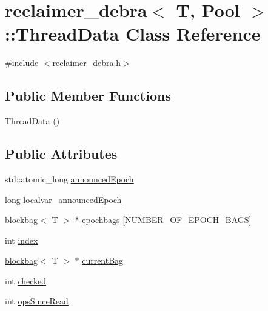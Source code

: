 \hypertarget{classreclaimer__debra_1_1ThreadData}{}\section{reclaimer\+\_\+debra$<$ T, Pool $>$\+:\+:Thread\+Data Class Reference}
\label{classreclaimer__debra_1_1ThreadData}


{\ttfamily \#include $<$reclaimer\+\_\+debra.\+h$>$}

\subsection*{Public Member Functions}
\begin{DoxyCompactItemize}
\item 
\hyperlink{classreclaimer__debra_1_1ThreadData_a3974b5f52cb86c4fac103224e438163d}{Thread\+Data} ()
\end{DoxyCompactItemize}
\subsection*{Public Attributes}
\begin{DoxyCompactItemize}
\item 
std\+::atomic\+\_\+long \hyperlink{classreclaimer__debra_1_1ThreadData_aa86de34e945bc1b5d1b98cec6508073b}{announced\+Epoch}
\item 
long \hyperlink{classreclaimer__debra_1_1ThreadData_a7b5c0008c0e0d93d36d0ff6222509963}{localvar\+\_\+announced\+Epoch}
\item 
\hyperlink{classblockbag}{blockbag}$<$ T $>$ $\ast$ \hyperlink{classreclaimer__debra_1_1ThreadData_ae2a76ecf79487fd59dc98f9e3db227b8}{epochbags} \mbox{[}\hyperlink{reclaimer__ebr__tree__q_8h_acc0cc9ce1a68a29c4e0e126887b517dd}{N\+U\+M\+B\+E\+R\+\_\+\+O\+F\+\_\+\+E\+P\+O\+C\+H\+\_\+\+B\+A\+GS}\mbox{]}
\item 
int \hyperlink{classreclaimer__debra_1_1ThreadData_ab02bc86812759af0725038ef64c52200}{index}
\item 
\hyperlink{classblockbag}{blockbag}$<$ T $>$ $\ast$ \hyperlink{classreclaimer__debra_1_1ThreadData_a13ae47aafc34001c5225b8f2fa0c06c8}{current\+Bag}
\item 
int \hyperlink{classreclaimer__debra_1_1ThreadData_ae6c8f53e846e6feab1cbb90d3aaf3924}{checked}
\item 
int \hyperlink{classreclaimer__debra_1_1ThreadData_ad35a3f25b69dcdf78c2e4979b65c9e32}{ops\+Since\+Read}
\end{DoxyCompactItemize}


